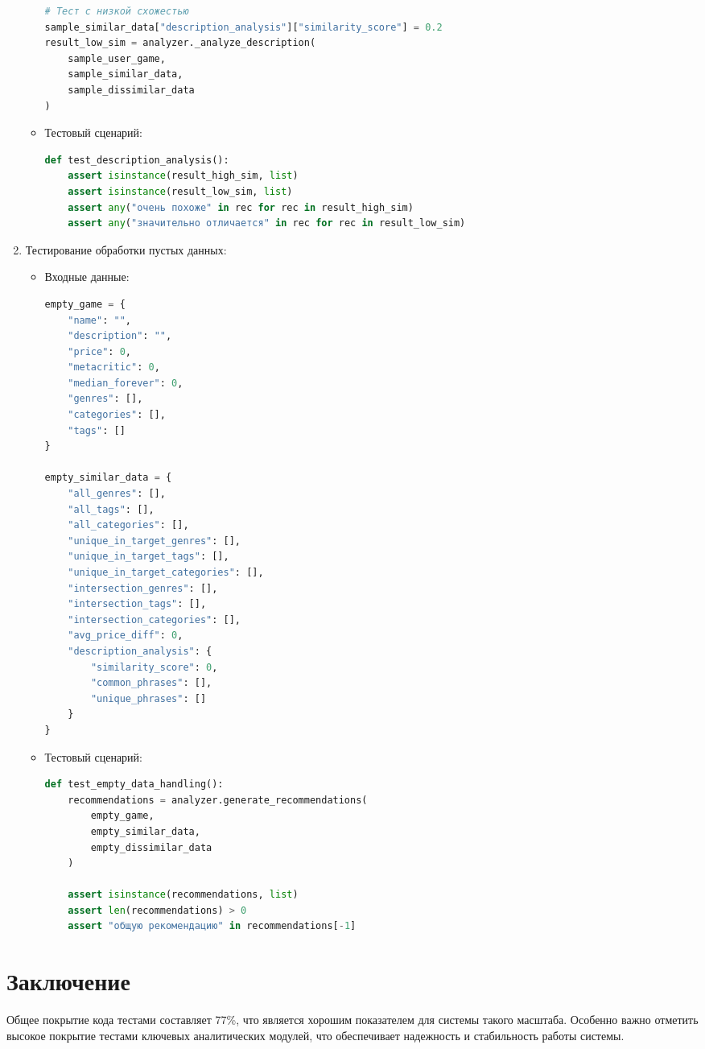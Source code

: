 \documentclass{article}
\begin{document}
\begin{enumerate}[label=\arabic*.]
\begin{itemize}
\begin{lstlisting}[language=Python]
# Тест с низкой схожестью
sample_similar_data["description_analysis"]["similarity_score"] = 0.2
result_low_sim = analyzer._analyze_description(
    sample_user_game, 
    sample_similar_data, 
    sample_dissimilar_data
)
        \end{lstlisting}
        \item Тестовый сценарий:
        \begin{lstlisting}[language=Python]
def test_description_analysis():
    assert isinstance(result_high_sim, list)
    assert isinstance(result_low_sim, list)
    assert any("очень похоже" in rec for rec in result_high_sim)
    assert any("значительно отличается" in rec for rec in result_low_sim)
        \end{lstlisting}
    \end{itemize}

    \item Тестирование обработки пустых данных:
    \begin{itemize}
        \item Входные данные:
        \begin{lstlisting}[language=Python]
empty_game = {
    "name": "",
    "description": "",
    "price": 0,
    "metacritic": 0,
    "median_forever": 0,
    "genres": [],
    "categories": [],
    "tags": []
}

empty_similar_data = {
    "all_genres": [],
    "all_tags": [],
    "all_categories": [],
    "unique_in_target_genres": [],
    "unique_in_target_tags": [],
    "unique_in_target_categories": [],
    "intersection_genres": [],
    "intersection_tags": [],
    "intersection_categories": [],
    "avg_price_diff": 0,
    "description_analysis": {
        "similarity_score": 0,
        "common_phrases": [],
        "unique_phrases": []
    }
}
        \end{lstlisting}
        \item Тестовый сценарий:
        \begin{lstlisting}[language=Python]
def test_empty_data_handling():
    recommendations = analyzer.generate_recommendations(
        empty_game, 
        empty_similar_data, 
        empty_dissimilar_data
    )
    
    assert isinstance(recommendations, list)
    assert len(recommendations) > 0
    assert "общую рекомендацию" in recommendations[-1]
        \end{lstlisting}
    \end{itemize}
\end{enumerate}

\section{Заключение}
Общее покрытие кода тестами составляет 77\%, что является хорошим показателем для системы такого масштаба. Особенно важно отметить высокое покрытие тестами ключевых аналитических модулей, что обеспечивает надежность и стабильность работы системы.
\end{document}
